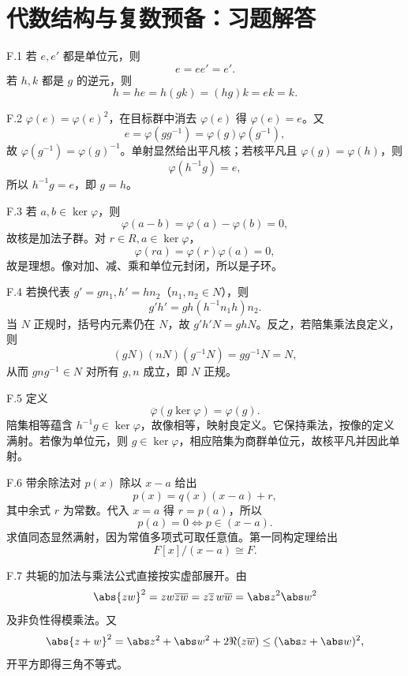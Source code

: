 \chapter{代数结构与复数预备：习题解答}

\begin{solution}{F.1}
若 \(e,e'\) 都是单位元，则
\[
 e=ee'=e'.
\]
若 \(h,k\) 都是 \(g\) 的逆元，则
\[
 h=he=h(gk)=(hg)k=ek=k.
\]
\end{solution}

\begin{solution}{F.2}
\(\varphi(e)=\varphi(e)^2\)，在目标群中消去 \(\varphi(e)\) 得 \(\varphi(e)=e\)。又
\[
 e=\varphi(gg^{-1})=\varphi(g)\varphi(g^{-1}),
\]
故 \(\varphi(g^{-1})=\varphi(g)^{-1}\)。单射显然给出平凡核；若核平凡且 \(\varphi(g)=\varphi(h)\)，则
\[
 \varphi(h^{-1}g)=e,
\]
所以 \(h^{-1}g=e\)，即 \(g=h\)。
\end{solution}

\begin{solution}{F.3}
若 \(a,b\in\ker\varphi\)，则
\[
 \varphi(a-b)=\varphi(a)-\varphi(b)=0,
\]
故核是加法子群。对 \(r\in R,a\in\ker\varphi\)，
\[
 \varphi(ra)=\varphi(r)\varphi(a)=0,
\]
故是理想。像对加、减、乘和单位元封闭，所以是子环。
\end{solution}

\begin{solution}{F.4}
若换代表 \(g'=gn_1,h'=hn_2\)（\(n_1,n_2\in N\)），则
\[
 g'h'=gh(h^{-1}n_1h)n_2.
\]
当 \(N\) 正规时，括号内元素仍在 \(N\)，故 \(g'h'N=ghN\)。反之，若陪集乘法良定义，则
\[
 (gN)(nN)(g^{-1}N)=gg^{-1}N=N,
\]
从而 \(gng^{-1}\in N\) 对所有 \(g,n\) 成立，即 \(N\) 正规。
\end{solution}

\begin{solution}{F.5}
定义
\[
 \overline\varphi(g\ker\varphi)=\varphi(g).
\]
陪集相等蕴含 \(h^{-1}g\in\ker\varphi\)，故像相等，映射良定义。它保持乘法，按像的定义满射。若像为单位元，则 \(g\in\ker\varphi\)，相应陪集为商群单位元，故核平凡并因此单射。
\end{solution}

\begin{solution}{F.6}
带余除法对 \(p(x)\) 除以 \(x-a\) 给出
\[
 p(x)=q(x)(x-a)+r,
\]
其中余式 \(r\) 为常数。代入 \(x=a\) 得 \(r=p(a)\)，所以
\[
 p(a)=0\Longleftrightarrow p\in(x-a).
\]
求值同态显然满射，因为常值多项式可取任意值。第一同构定理给出
\[
 F[x]/(x-a)\cong F.
\]
\end{solution}

\begin{solution}{F.7}
共轭的加法与乘法公式直接按实虚部展开。由
\[
 \abs{zw}^2=zw\overline{zw}
 =z\overline z\,w\overline w
 =\abs z^2\abs w^2
\]
及非负性得模乘法。又
\[
 \abs{z+w}^2
 =\abs z^2+\abs w^2+2\Re(z\overline w)
 \le(\abs z+\abs w)^2,
\]
开平方即得三角不等式。
\end{solution}

